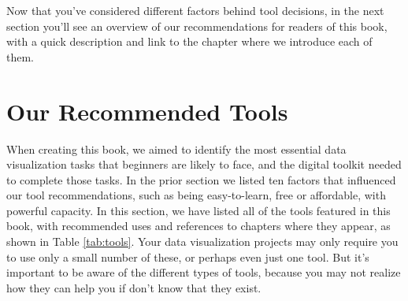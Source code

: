 \documentclass[
  english,
]{book}
\begin{document}
Now that you've considered different factors behind tool decisions, in the next section you'll see an overview of our recommendations for readers of this book, with a quick description and link to the chapter where we introduce each of them.

\hypertarget{recommended-tools}{%
\section*{Our Recommended Tools}\label{recommended-tools}}

When creating this book, we aimed to identify the most essential data visualization tasks that beginners are likely to face, and the digital toolkit needed to complete those tasks. In the prior section we listed ten factors that influenced our tool recommendations, such as being easy-to-learn, free or affordable, with powerful capacity. In this section, we have listed all of the tools featured in this book, with recommended uses and references to chapters where they appear, as shown in Table \ref{tab:tools}. Your data visualization projects may only require you to use only a small number of these, or perhaps even just one tool. But it's important to be aware of the different types of tools, because you may not realize how they can help you if don't know that they exist.
\end{document}
